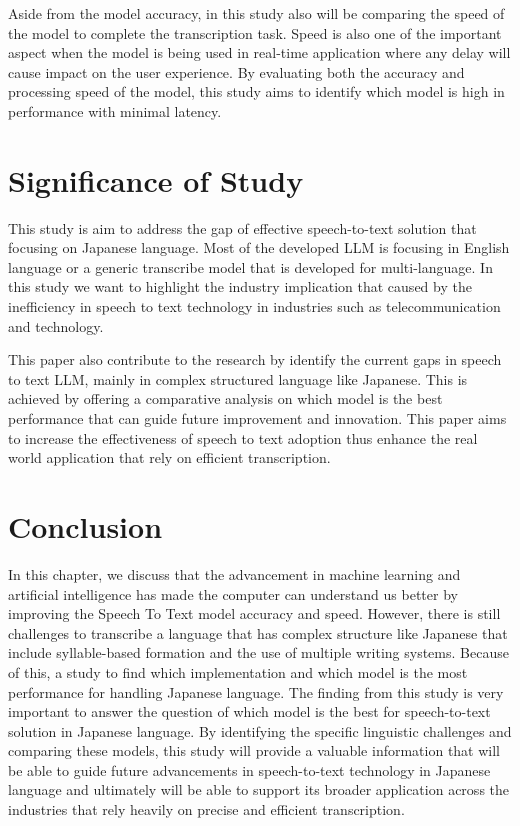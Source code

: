 Aside from the model accuracy, in this study also will be comparing the speed of the model to complete the transcription task. Speed is also one of the important aspect when the model is being used in real-time application where any delay will cause impact on the user experience. By evaluating both the accuracy and processing speed of the model, this study aims to identify which model is high in performance with minimal latency.  


\section{Significance of Study}
This study is aim to address the gap of effective speech-to-text solution that focusing on Japanese language. Most of the developed LLM is focusing in English language or a generic transcribe model that is developed for multi-language. In this study we want to highlight the industry implication that caused by the inefficiency in speech to text technology in industries such as telecommunication and technology. 

This paper also contribute to the research by identify the current gaps in speech to text LLM, mainly in complex structured language like Japanese. This is achieved by offering a comparative analysis on which model is the best performance that can guide future improvement and innovation. This paper aims to increase the effectiveness of speech to text adoption thus enhance the real world application that rely on efficient transcription. 

\section{Conclusion}
In this chapter, we discuss that the advancement in machine learning and artificial intelligence has made the computer can understand us better by improving the Speech To Text model accuracy and speed. However, there is still challenges to transcribe a language that has complex structure like Japanese that include syllable-based formation and the use of multiple writing systems. Because of this, a study to find which implementation and which model is the most performance for handling Japanese language. The finding from this study is very important to answer the question of which model is the best for speech-to-text solution in Japanese language. By  identifying the specific linguistic challenges and comparing these models, this study will provide a valuable information that will be able to guide future advancements in speech-to-text technology in Japanese language and ultimately will be able to support its broader application across the industries that rely heavily on precise and efficient transcription.

